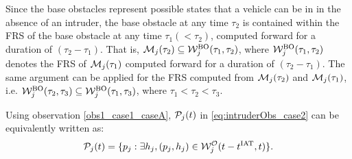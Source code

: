 \begin{itemize}[leftmargin=*]
\begin{observation} \label{obs1_case1_caseA}
Since the base obstacles represent possible states that a vehicle can be in in the absence of an intruder, the base obstacle at any time $\tau_2$ is contained within the FRS of the base obstacle at any time $\tau_1 (< \tau_2)$, computed forward for a duration of $(\tau_2-\tau_1).$ That is, $\mathcal{M}_j(\tau_2) \subseteq \mathcal{W}_{j}^{\text{BO}}(\tau_1, \tau_2)$, where $\mathcal{W}_{j}^{\text{BO}}(\tau_1, \tau_2)$ denotes the FRS of $\mathcal{M}_j(\tau_1)$ computed forward for a duration of $(\tau_2-\tau_1)$. The same argument can be applied for the FRS computed from $\mathcal{M}_j(\tau_2)$ and $\mathcal{M}_j(\tau_1)$, i.e. $\mathcal{W}_{j}^{\text{BO}}(\tau_2, \tau_3) \subseteq \mathcal{W}_{j}^{\text{BO}}(\tau_1, \tau_3)$, where $\tau_1 < \tau_2 < \tau_3$.
\end{observation}

Using observation \ref{obs1_case1_caseA}, $\mathcal{P}_j(t)$ in \eqref{eq:intruderObs_case2} can be equivalently written as:
\begin{equation} \label{eq:intruderObs_case2_inter}
\pfrs_j(t) = \{p_j: \exists \npos_j, (p_j, \npos_j) \in \frs_{j}^{\mathcal{O}}(t-\iat, t) \}.
\end{equation}


\end{itemize}
